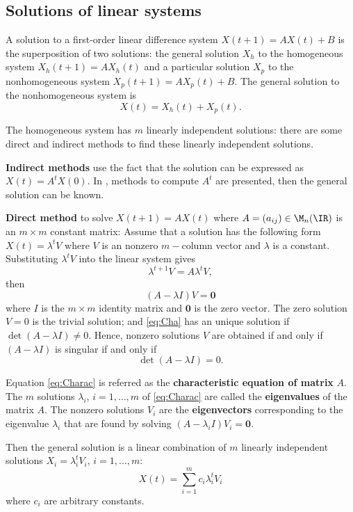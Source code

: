 \subsection{Solutions of linear systems}
A solution to a first-order linear difference system $X(t+1)=AX(t)+B$ is the superposition of two solutions: the general solution $X_h$ to the homogeneous system $X_h(t+1)=AX_h(t)$ and a particular solution $X_p$ to the nonhomogeneous system $X_p(t+1)=AX_p(t)+B$. The general solution to the nonhomogeneous system is $$X(t)=X_h(t)+X_p(t).$$


The homogeneous system has $m$ linearly independent solutions: there are some direct and indirect methods to find these linearly independent solutions.

{\bf Indirect methods} use the fact that the solution can be expressed as $X(t)=A^tX(0)$. In \cite{Elaydi1998}, methods to compute $A^t$ are presented, then the general solution can be known.

{\bf Direct method} to solve $X(t+1)=AX(t)$ where $A=(a_{ij})\in\M_n(\IR)$ is an $m\times m$ constant matrix:
Assume that a solution has the following form $X(t)=\lambda ^t V$ where $V$ is an nonzero $m-$column vector and $\lambda$ is a constant. Substituting $\lambda ^t V$ into the linear system gives
$$\lambda ^{t+1} V=A\lambda ^t V,$$
then
\begin{equation}(A - \lambda I) V=\mathbf{0}\label{eq:Cha}\end{equation}
where $I$ is the $m\times m$ identity matrix and $\mathbf{0}$ is the zero vector. The zero solution $V=0$ is the trivial solution; and \eqref{eq:Cha} has an unique solution if $\det(A - \lambda I)\not =0$. Hence, nonzero solutions $V$ are obtained if and only if $(A - \lambda I) $ is singular if and only if 
\begin{equation}\det(A - \lambda I) =0.\label{eq:Charac}\end{equation}

Equation \eqref{eq:Charac} is referred as the {\bf characteristic equation of matrix} $A$. The $m$ solutions $\lambda_i$, $i=1,\dots, m$ of \eqref{eq:Charac} are called the {\bf eigenvalues} of the matrix $A$. The nonzero solutions $V_i$ are the {\bf eigenvectors} corresponding to the eigenvalue $\lambda_i$ that are found by solving $(A - \lambda_i I) V_i=\mathbf{0}$.

Then the general solution is a linear combination of $m$ linearly independent solutions $X_i=\lambda _i ^t V_i$, $i=1,\dots, m$:
\begin{equation}X(t)=\sum_{i=1}^m c_i\lambda _i ^t V_i\label{eq:solFirstSyst}\end{equation}
where $c_i$ are arbitrary constants.

